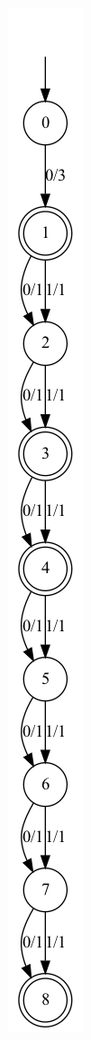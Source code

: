 \begin{figure}
\begin{subfigure}{.45\textwidth}
        \caption{}
        \label{add_inners_det_1_img_aut2}
    \end{subfigure}
    \hfil
    \begin{subfigure}{.25\textwidth}
        \centering
        \includegraphics[scale=0.26]{obrazky-figures/add_inners_det_1_img_aut3.png}

\end{subfigure}
\end{figure}
